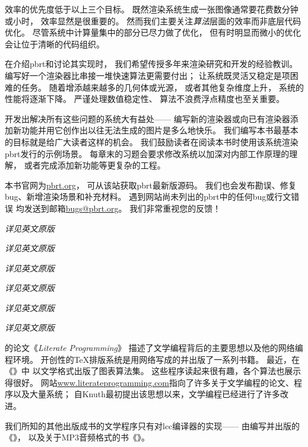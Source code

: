 效率的优先度低于以上三个目标。
既然渲染系统生成一张图像通常要花费数分钟或小时，
效率显然是很重要的。
然而我们主要关注{\itshape 算法}层面的效率而非底层代码优化。
尽管系统中计算量集中的部分已尽力做了优化，
但有时明显而微小的优化会让位于清晰的代码组织。

在介绍pbrt和讨论其实现时，
我们希望传授多年来渲染研究和开发的经验教训。
编写好一个渲染器比串接一堆快速算法更需要付出；
让系统既灵活又稳定是项困难的任务。
随着增添越来越多的几何体或光源，
或者其他复杂维度上升，
系统的性能将逐渐下降。
严谨处理数值稳定性、
算法不浪费浮点精度也至关重要。

开发出解决所有这些问题的系统大有益处——
编写新的渲染器或向已有渲染器添加新功能并用它创作出以往无法生成的图片是多么地快乐。
我们编写本书最基本的目标就是给广大读者这样的机会。
我们鼓励读者在阅读本书时使用该系统渲染pbrt发行的示例场景。
每章末的习题会要求修改系统以加深对内部工作原理的理解，
或者完成添加新功能等更复杂的工程。

本书官网为\href{www.pbrt.org}{\ttfamily pbrt.org}，
可从该站获取pbrt最新版源码。
我们也会发布勘误、修复bug、新增渲染场景和补充材料。
遇到网站尚未列出的pbrt中的任何bug或行文错误
均发送到邮箱\href{mailto:bugs@pbrt.org}{\url{bugs@pbrt.org}}。
我们非常重视您的反馈！\\


{\itshape 详见英文原版}\\


{\itshape 详见英文原版}\\


{\itshape 详见英文原版}\\


{\itshape 详见英文原版}\\


{\itshape 详见英文原版}\\


{\itshape 详见英文原版}\\


\citet{10.1093/comjnl/27.2.97}的论文《\emph{Literate Programming}》
描述了文学编程背后的主要思想以及他的网络编程环境。
开创性的\TeX 排版系统是用网络写成的并出版了一系列书籍\citep{10.5555/536126,10.5555/536123}。
最近，\citet{10.1145/164984}在《》中
以文学格式出版了图表算法集。
这些程序读起来很有趣，各个算法也展示得很好。
网站\url{www.literateprogramming.com}指向了许多关于文学编程的论文、程序以及大量系统；
自Knuth最初提出该思想以来，文学编程已经进行了许多改进。


我们所知的其他出版成书的文学程序只有对lcc编译器的实现——
由\citet{10.5555/555424}编写并出版的《》，
以及\citet{10.5555/1036653}关于MP3音频格式的书《》。

